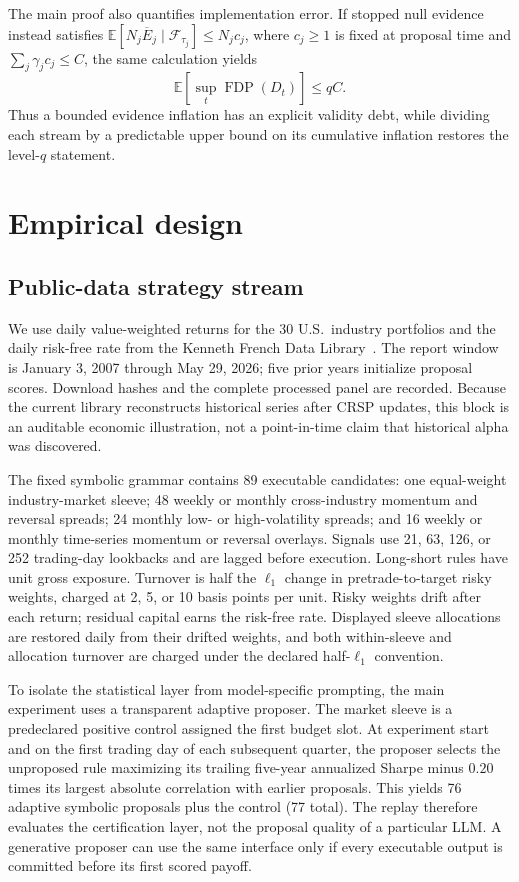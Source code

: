 The main proof also quantifies implementation error.  If stopped null
evidence instead satisfies
\(\mathbb E[N_j\overline E_j\mid\mathcal F_{\tau_j}]
\le N_jc_j\), where \(c_j\ge1\) is fixed at proposal time and
\(\sum_j\gamma_jc_j\le C\), the same calculation yields
\begin{equation}
\mathbb E[\sup_t\operatorname{FDP}(D_t)]\le qC.
\label{eq:validity-debt}
\end{equation}
Thus a bounded evidence inflation has an explicit validity debt, while
dividing each stream by a predictable upper bound on its cumulative inflation
restores the level-\(q\) statement.

\section{Empirical design}
\label{sec:experiments}

\subsection{Public-data strategy stream}

We use daily value-weighted returns for the 30 U.S.\ industry portfolios and
the daily risk-free rate from the Kenneth French Data
Library~\cite{french2026data}.  The report window is January 3, 2007 through
May 29, 2026; five prior years initialize proposal scores.  Download hashes
and the complete processed panel are recorded.  Because the current library
reconstructs historical series after CRSP updates, this block is an auditable
economic illustration, not a point-in-time claim that historical alpha was
discovered.

The fixed symbolic grammar contains 89 executable candidates: one
equal-weight industry-market sleeve; 48 weekly or monthly cross-industry
momentum and reversal spreads; 24 monthly low- or high-volatility spreads;
and 16 weekly or monthly time-series momentum or reversal overlays.  Signals
use 21, 63, 126, or 252 trading-day lookbacks and are lagged before execution.
Long-short rules have unit gross exposure.  Turnover is half the
\(\ell_1\) change in pretrade-to-target risky weights, charged at 2, 5, or 10
basis points per unit.  Risky weights drift after each return; residual capital
earns the risk-free rate.  Displayed sleeve allocations are restored daily
from their drifted weights, and both within-sleeve and allocation turnover are
charged under the declared half-\(\ell_1\) convention.

To isolate the statistical layer from model-specific prompting, the main
experiment uses a transparent adaptive proposer.  The market sleeve is a
predeclared positive control assigned the first budget slot.  At experiment
start and on the first trading day of each subsequent quarter, the proposer
selects the unproposed rule maximizing its trailing five-year annualized
Sharpe minus \(0.20\) times its largest absolute correlation with earlier
proposals.  This yields 76 adaptive symbolic proposals plus the control (77
total).  The replay therefore evaluates the certification layer, not the
proposal quality of a particular LLM.  A generative proposer can use the same
interface only if every executable output is committed before its first scored
payoff.

